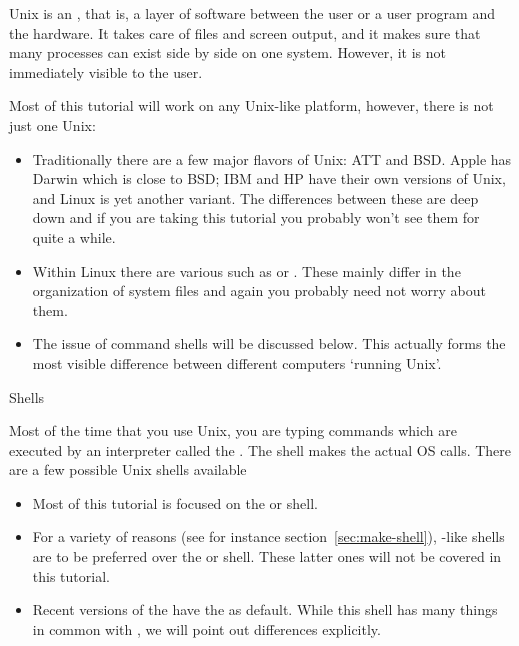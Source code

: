
Unix is an , that is, a layer of software
between the user or a user program and the hardware. It takes care of
files and screen output, and it makes sure that many processes can exist
side by side on one system. However, it is not immediately visible to
the user.

Most of this tutorial will work on any Unix-like platform,
however, there is not just one Unix:
\begin{itemize}
\item Traditionally there are a few major flavors of Unix: ATT and BSD.
  Apple has Darwin which is close to BSD; IBM and HP have their own
  versions of Unix, and Linux is yet another variant. The differences between
  these are deep down and if you are taking this tutorial you probably
  won't see them for quite a while.
\item Within Linux there are various 
  such as  or . These mainly differ
  in the organization of system files and again you probably need not worry
  about them.
\item The issue of command shells will be discussed below.
  This actually forms the most visible difference between different
  computers `running Unix'.
\end{itemize}


 {Shells}

Most of the time that you use Unix, you are typing commands which are
executed by an interpreter called the . The shell
makes the actual \ac{OS} calls. There are a few possible Unix shells
available
\begin{itemize}
\item Most of this tutorial is focused on the
   or  shell.
\item For a variety of reasons (see for instance section~\ref{sec:make-shell}),
  -like shells are to be preferred over the
   or  shell. These latter ones will not be covered
  in this tutorial.
\item Recent versions of the 
  have the  as default.
  While this shell has many things in common with ,
  we will point out differences explicitly.
\end{itemize}


